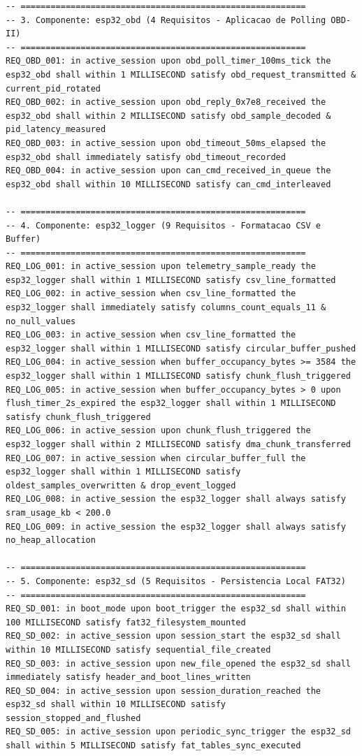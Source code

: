 \begin{lstlisting}[language=FRETish, caption={Catálogo das 48 sentenças formalizadas na gramática FRETish.}]
-- =========================================================
-- 3. Componente: esp32_obd (4 Requisitos - Aplicacao de Polling OBD-II)
-- =========================================================
REQ_OBD_001: in active_session upon obd_poll_timer_100ms_tick the esp32_obd shall within 1 MILLISECOND satisfy obd_request_transmitted & current_pid_rotated
REQ_OBD_002: in active_session upon obd_reply_0x7e8_received the esp32_obd shall within 2 MILLISECOND satisfy obd_sample_decoded & pid_latency_measured
REQ_OBD_003: in active_session upon obd_timeout_50ms_elapsed the esp32_obd shall immediately satisfy obd_timeout_recorded
REQ_OBD_004: in active_session upon can_cmd_received_in_queue the esp32_obd shall within 10 MILLISECOND satisfy can_cmd_interleaved

-- =========================================================
-- 4. Componente: esp32_logger (9 Requisitos - Formatacao CSV e Buffer)
-- =========================================================
REQ_LOG_001: in active_session upon telemetry_sample_ready the esp32_logger shall within 1 MILLISECOND satisfy csv_line_formatted
REQ_LOG_002: in active_session when csv_line_formatted the esp32_logger shall immediately satisfy columns_count_equals_11 & no_null_values
REQ_LOG_003: in active_session when csv_line_formatted the esp32_logger shall within 1 MILLISECOND satisfy circular_buffer_pushed
REQ_LOG_004: in active_session when buffer_occupancy_bytes >= 3584 the esp32_logger shall within 1 MILLISECOND satisfy chunk_flush_triggered
REQ_LOG_005: in active_session when buffer_occupancy_bytes > 0 upon flush_timer_2s_expired the esp32_logger shall within 1 MILLISECOND satisfy chunk_flush_triggered
REQ_LOG_006: in active_session upon chunk_flush_triggered the esp32_logger shall within 2 MILLISECOND satisfy dma_chunk_transferred
REQ_LOG_007: in active_session when circular_buffer_full the esp32_logger shall within 1 MILLISECOND satisfy oldest_samples_overwritten & drop_event_logged
REQ_LOG_008: in active_session the esp32_logger shall always satisfy sram_usage_kb < 200.0
REQ_LOG_009: in active_session the esp32_logger shall always satisfy no_heap_allocation

-- =========================================================
-- 5. Componente: esp32_sd (5 Requisitos - Persistencia Local FAT32)
-- =========================================================
REQ_SD_001: in boot_mode upon boot_trigger the esp32_sd shall within 100 MILLISECOND satisfy fat32_filesystem_mounted
REQ_SD_002: in active_session upon session_start the esp32_sd shall within 10 MILLISECOND satisfy sequential_file_created
REQ_SD_003: in active_session upon new_file_opened the esp32_sd shall immediately satisfy header_and_boot_lines_written
REQ_SD_004: in active_session upon session_duration_reached the esp32_sd shall within 10 MILLISECOND satisfy session_stopped_and_flushed
REQ_SD_005: in active_session upon periodic_sync_trigger the esp32_sd shall within 5 MILLISECOND satisfy fat_tables_sync_executed


\end{lstlisting}

